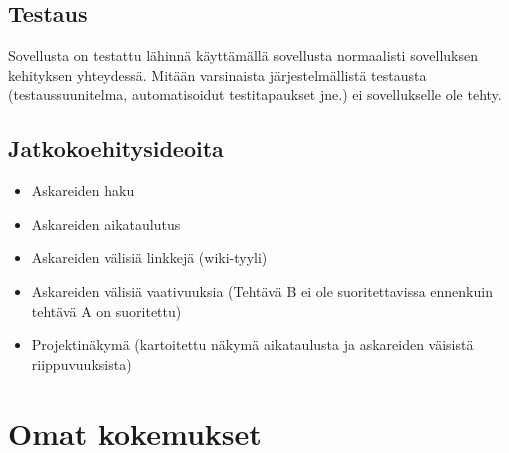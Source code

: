 ﻿\documentclass[finnish]{report}
\begin{document}
\section{Testaus}

Sovellusta on testattu lähinnä käyttämällä sovellusta normaalisti sovelluksen kehityksen yhteydessä. Mitään varsinaista järjestelmällistä testausta (testaussuunitelma, automatisoidut testitapaukset jne.) ei sovellukselle ole tehty.

\section{Jatkokoehitysideoita}

\begin{itemize}
  \item Askareiden haku
  \item Askareiden aikataulutus
  \item Askareiden välisiä linkkejä (wiki-tyyli)
  \item Askareiden välisiä vaativuuksia (Tehtävä B ei ole suoritettavissa ennenkuin tehtävä A on suoritettu)
  \item Projektinäkymä (kartoitettu näkymä aikataulusta ja askareiden väisistä riippuvuuksista)
\end{itemize}


\chapter{Omat kokemukset}
\end{document}
